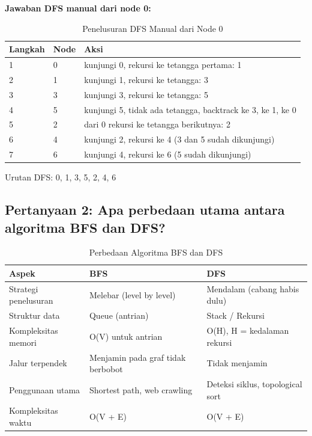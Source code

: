 \vspace{1em}
\textbf{Jawaban DFS manual dari node 0:}
\begin{table}[H]
    \centering
    \caption{Penelusuran DFS Manual dari Node 0}
    \begin{tabular}{llp{9cm}}
    \toprule
    \textbf{Langkah} & \textbf{Node} & \textbf{Aksi} \\ \midrule
    1 & 0 & kunjungi 0, rekursi ke tetangga pertama: 1 \\
    2 & 1 & kunjungi 1, rekursi ke tetangga: 3 \\
    3 & 3 & kunjungi 3, rekursi ke tetangga: 5 \\
    4 & 5 & kunjungi 5, tidak ada tetangga, backtrack ke 3, ke 1, ke 0 \\
    5 & 2 & dari 0 rekursi ke tetangga berikutnya: 2 \\
    6 & 4 & kunjungi 2, rekursi ke 4 (3 dan 5 sudah dikunjungi) \\
    7 & 6 & kunjungi 4, rekursi ke 6 (5 sudah dikunjungi) \\ \bottomrule
    \end{tabular}
\end{table}
Urutan DFS: 0, 1, 3, 5, 2, 4, 6

\subsection*{Pertanyaan 2: Apa perbedaan utama antara algoritma BFS dan DFS?}

\begin{table}[H]
    \centering
    \caption{Perbedaan Algoritma BFS dan DFS}
    \begin{tabular}{p{3.5cm}p{5cm}p{5cm}}
    \toprule
    \textbf{Aspek} & \textbf{BFS} & \textbf{DFS} \\ \midrule
    Strategi penelusuran & Melebar (level by level) & Mendalam (cabang habis dulu) \\
    Struktur data & Queue (antrian) & Stack / Rekursi \\
    Kompleksitas memori & O(V) untuk antrian & O(H), H = kedalaman rekursi \\
    Jalur terpendek & Menjamin pada graf tidak berbobot & Tidak menjamin \\
    Penggunaan utama & Shortest path, web crawling & Deteksi siklus, topological sort \\
    Kompleksitas waktu & O(V + E) & O(V + E) \\ \bottomrule
    \end{tabular}
\end{table}